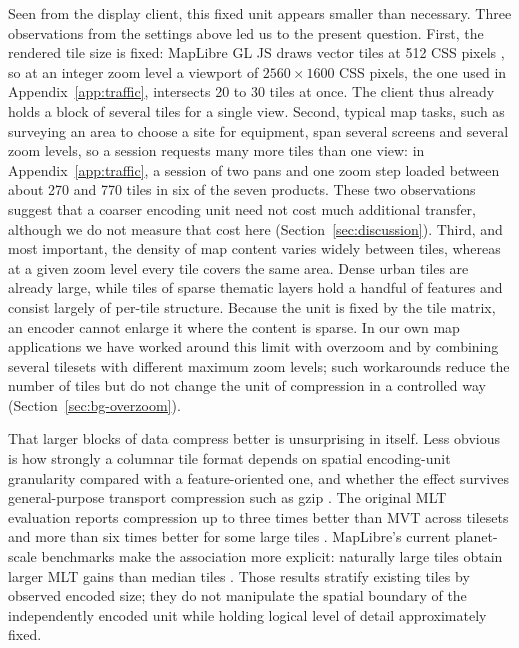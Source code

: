Seen from the display client, this fixed unit appears smaller than necessary. Three
observations from the settings above led us to the present question. First, the rendered
tile size is fixed: MapLibre GL JS draws vector tiles at 512 CSS pixels
\citep{maplibre_gljs_vectorsource}, so at an integer zoom level a viewport of
$2560\times1600$ CSS pixels, the one used in Appendix~\ref{app:traffic}, intersects 20 to
30 tiles at once. The client thus already holds a block of several tiles for a single
view. Second, typical map tasks, such as surveying an area to choose a site for
equipment, span several screens and several zoom levels, so a session requests many more
tiles than one view: in Appendix~\ref{app:traffic}, a session of two pans and one zoom
step loaded between about 270 and 770 tiles in six of the seven products. These two
observations suggest that a coarser encoding unit need not cost much additional transfer,
although we do not measure that cost here (Section~\ref{sec:discussion}). Third, and most
important, the density of map content varies widely between tiles, whereas at a given
zoom level every tile covers the same area. Dense urban tiles are already large, while
tiles of sparse thematic layers hold a handful of features and consist largely of
per-tile structure. Because the unit is fixed by the tile matrix, an encoder cannot
enlarge it where the content is sparse. In our own map applications we have worked around
this limit with overzoom and by combining several tilesets with different maximum zoom
levels; such workarounds reduce the number of tiles but do not change the unit of
compression in a controlled way (Section~\ref{sec:bg-overzoom}).

That larger blocks of data compress better is unsurprising in itself.
Less obvious is how strongly a columnar tile format depends on spatial encoding-unit
granularity compared with a feature-oriented one, and whether the effect survives
general-purpose transport compression such as gzip \citep{rfc1951, rfc1952}. The
original MLT evaluation reports compression up to three times better than MVT across
tilesets and more than six times better for some large tiles
\citep{tremmel2025mlt}. MapLibre's current planet-scale benchmarks make the association
more explicit: naturally large tiles obtain larger MLT gains than median tiles
\citep{maplibre_mlt_benchmarks}. Those results stratify existing tiles by observed
encoded size; they do not manipulate the spatial boundary of the independently encoded
unit while holding logical level of detail approximately fixed.

